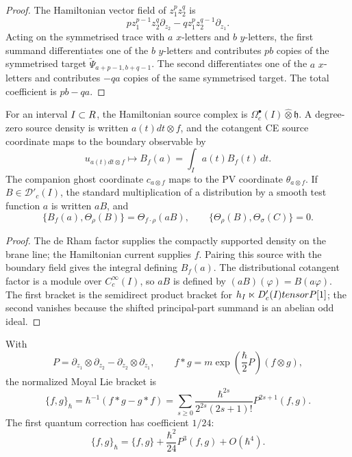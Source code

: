 \begin{proof}
  The Hamiltonian vector field of \(z_1^pz_2^q\) is
  \[
    pz_1^{p-1}z_2^q\partial_{z_2}
    -qz_1^pz_2^{q-1}\partial_{z_1}.
  \]
  Acting on the symmetrised trace with \(a\) \(x\)-letters and \(b\)
  \(y\)-letters, the first summand differentiates one of the \(b\)
  \(y\)-letters and contributes \(pb\) copies of the symmetrised target
  \(\widetilde\Psi_{a+p-1,b+q-1}\).  The second differentiates one of
  the \(a\) \(x\)-letters and contributes \(-qa\) copies of the same
  symmetrised target.  The total coefficient is \(pb-qa\).
\end{proof}

\begin{lem}
\label{lem:app-sign-current-source}
  For an interval \(I\subset R\), the Hamiltonian source complex is
  \(\Omega^\bullet_c(I)\widehat\otimes\mathfrak h\).  A degree-zero
  source density is written \(a(t)dt\otimes f\), and the cotangent CE
  source coordinate maps to the boundary observable by
  \[
    u_{a(t)dt\otimes f}\longmapsto
    B_f(a)=\int_I a(t)B_f(t)\,dt.
  \]
  The companion ghost coordinate \(c_{a\otimes f}\) maps to the PV
  coordinate \(\theta_{a\otimes f}\).  If
  \(B\in\mathcal D'_c(I)\), the standard multiplication of a distribution
  by a smooth test function \(a\) is written \(aB\), and
  \[
    \{B_f(a),\Theta_\rho(B)\}=\Theta_{f\cdot\rho}(aB),\qquad
    \{\Theta_\rho(B),\Theta_\sigma(C)\}=0.
  \]
\end{lem}

\begin{proof}
  The de Rham factor supplies the compactly supported density on the
  brane line; the Hamiltonian current supplies \(f\).  Pairing this source
  with the boundary field gives the integral defining \(B_f(a)\).  The
  distributional cotangent factor is a module over
  \(C_c^\infty(I)\), so \(aB\) is defined by
  \((aB)(\varphi)=B(a\varphi)\).  The first bracket is the semidirect
  product bracket for
  \(h_I\ltimes D'_c(I)tensorP[1]\);
  the second vanishes because the shifted principal-part summand is an
  abelian odd ideal.
\end{proof}

\begin{lem}
\label{lem:app-sign-moyal-coefficients}
  With
  \[
    P=\partial_{z_1}\otimes\partial_{z_2}
      -\partial_{z_2}\otimes\partial_{z_1},
    \qquad
    f*g=m\exp\!\left(\frac{\hbar}{2}P\right)(f\otimes g),
  \]
  the normalized Moyal Lie bracket is
  \[
    \{f,g\}_\hbar
      =
      \hbar^{-1}(f*g-g*f)
      =
      \sum_{s\ge0}
      \frac{\hbar^{2s}}{2^{2s}(2s+1)!}P^{2s+1}(f,g).
  \]
  The first quantum correction has coefficient \(1/24\):
  \[
    \{f,g\}_\hbar=\{f,g\}+\frac{\hbar^2}{24}P^3(f,g)+O(\hbar^4).
  \]
\end{lem}

